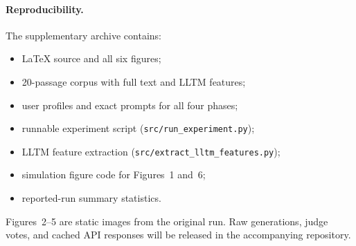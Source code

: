 \documentclass[11pt]{article}
\begin{document}
\paragraph{Reproducibility.}
The supplementary archive contains:
\begin{itemize}[nosep,leftmargin=1.5em]
  \item \LaTeX{} source and all six figures;
  \item 20-passage corpus with full text and LLTM features;
  \item user profiles and exact prompts for all four phases;
  \item runnable experiment script (\texttt{src/run\_experiment.py});
  \item LLTM feature extraction (\texttt{src/extract\_lltm\_features.py});
  \item simulation figure code for Figures~1 and~6;
  \item reported-run summary statistics.
\end{itemize}
Figures~2--5 are static images from the original run.
Raw generations, judge votes, and cached API responses will be released in the accompanying repository.
\end{document}
